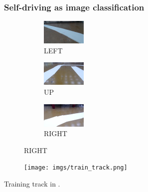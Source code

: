 \documentclass{beamer}
\begin{document}
\begin{frame}
  \frametitle{Self-driving as image classification}

  \begin{figure}
    \begin{subfigure}{0.3\linewidth}
      \centering\includegraphics{imgs/sample_left.png}
      \captionsetup{justification=centering}
      \caption*{LEFT}
    \end{subfigure}
    \begin{subfigure}{0.3\linewidth}
      \centering\includegraphics{imgs/sample_up.png}
      \captionsetup{justification=centering}
      \caption*{UP}
    \end{subfigure}
    \begin{subfigure}{0.3\linewidth}
      \centering\includegraphics{imgs/sample_right.png}
      \captionsetup{justification=centering}
      \caption*{RIGHT}
    \end{subfigure}
  \end{figure}

  \begin{figure}
    \centering\texttt{[image: imgs/train\_track.png]}
  \end{figure}

  \begin{center}
    Training track in \cite{moraes18}.
  \end{center}
\end{frame}
\end{document}
